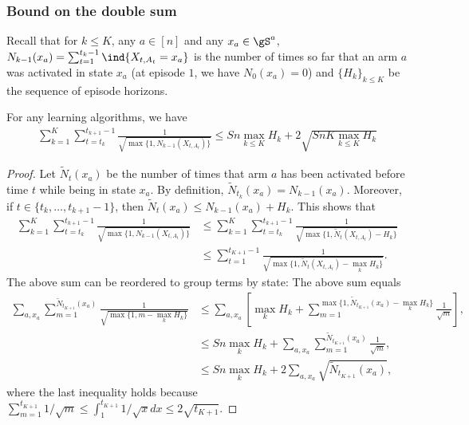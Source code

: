 \begin{subappendices}
\subsubsection{Bound on  the double sum}

Recall that for $k\le K$, any $a\in[n]$ and any $x_a\in\gS^a$, $N_{k-1}(x_a)=\sum_{t=1}^{t_{k}-1}\ind{X_{t,A_t}=x_a}$ is the number of times so far that an arm $a$ was activated in state $x_a$ (at episode $1$, we have ${N_0(x_a)=0}$) and $\{H_k\}_{k\le K}$ be the sequence of episode horizons.

\begin{lem}
    \label{lem:sum}
    For any learning algorithms, we have
    \begin{align*}
        \sum_{k=1}^K \sum_{t=t_k}^{t_{k+1}-1}\frac1{\sqrt{\max\{1,N_{k-1}(X_{t,A_t})\} }} \le Sn\max_{k\le K}H_k+2\sqrt{SnK\max_{k\le K}H_k}
    \end{align*}
\end{lem}
\begin{proof}
Let $\tilde{N}_t(x_a)$ be the number of times that arm $a$ has been activated before time $t$ while being in state $x_a$. By definition, $\tilde{N}_{t_k}(x_a)=N_{k-1}(x_a)$. Moreover, if $t\in\{t_k,\dots, t_{k+1}-1\}$, then $\tilde{N}_t(x_a)\le N_{k-1}(x_a) + H_k$. This shows that 
\begin{align*}
    \sum_{k=1}^K \sum_{t=t_k}^{t_{k+1}-1}\frac1{\sqrt{\max\{1,N_{k-1}(X_{t,A_t})\} }}
    &\le \sum_{k=1}^K \sum_{t=t_k}^{t_{k+1}-1}\frac{1}{\sqrt{\max\{1, \tilde{N}_t(X_{t,A_t})-H_k\} }}\\
    &\le \sum_{t=1}^{t_{K+1}-1} \frac{1}{\sqrt{\max\{1,\tilde{N}_t(X_{t,A_t})-\max_k H_k\} }}.
\end{align*}
The above sum can be reordered to group terms by state: The above sum equals
\begin{align*}        
    \sum_{a, x_a} \sum_{m=1}^{\tilde{N}_{t_{K+1}}(x_a)} \frac{1}{\sqrt{\max\{1, m-\max_k H_k\} }}
    &\le \sum_{a, x_a} \left[\max_k H_k + \sum_{m=1}^{\max\{1,\tilde{N}_{t_{K+1}}(x_a)-\max_k H_k\}} \frac{1}{\sqrt{m}}\right],\\
    &\le Sn\max_k H_k + \sum_{a, x_a} \sum_{m=1}^{\tilde{N}_{t_{K+1}}(x_a)} \frac{1}{\sqrt{m}},\\
    &\le Sn\max_k H_k + 2\sum_{a, x_a} \sqrt{\tilde{N}_{t_{K+1}}(x_a)},
\end{align*}
where the last inequality holds because $\sum_{m=1}^{t_{K+1}}1/\sqrt{m}\le\int_1^{t_{K+1}}1/\sqrt{x}dx\le2\sqrt{{t_{K+1}}}$. 


\end{proof}
\end{subappendices}
